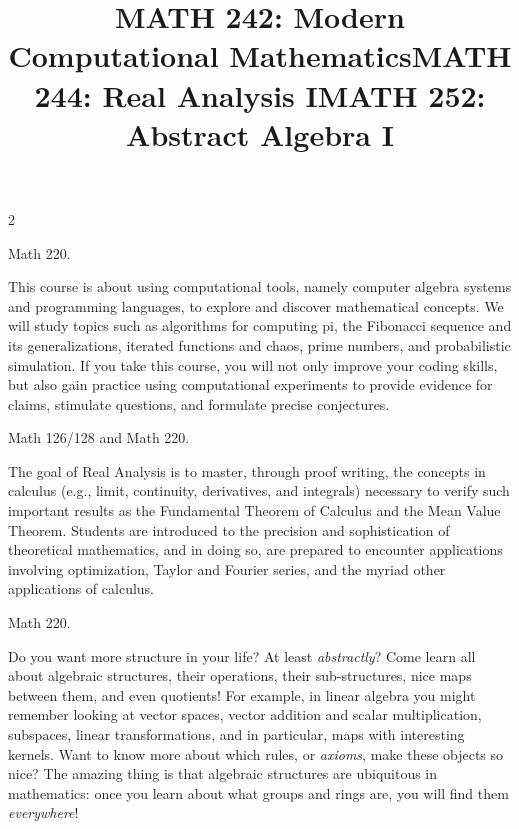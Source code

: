 \documentclass[12pt]{article}
\newcommand{\bolder}{\textbf}
\begin{document}
\begin{multicols}{2}
\begin{tcolorbox}[colback=white, colframe=black]
    \begin{center}
    \title{{\large \bolder{MATH 242: Modern Computational Mathematics}}}
    \end{center}
\end{tcolorbox}

 Math 220.

This course is about using computational tools, namely computer algebra systems and programming languages, to explore and discover mathematical concepts. We will study topics such as algorithms for computing pi, the Fibonacci sequence and its generalizations, iterated functions and chaos, prime numbers, and probabilistic simulation. If you take this course, you will not only improve your coding skills, but also gain practice using computational experiments to provide evidence for claims, stimulate questions, and formulate precise conjectures. 


\begin{tcolorbox}[colback=white, colframe=black]
    \begin{center}
    \title{{\large \bolder{MATH 244: Real Analysis I}}}
    \end{center}
\end{tcolorbox}

 Math 126/128 and Math 220.

The goal of Real Analysis is to master, through proof writing, the concepts in calculus (e.g., limit, continuity, derivatives, and integrals) necessary to verify such important results as the Fundamental Theorem of Calculus and the Mean Value Theorem. Students are introduced to the precision and sophistication of theoretical mathematics, and in doing so, are prepared to encounter applications involving optimization, Taylor and Fourier series, and the myriad other applications of calculus.


\begin{tcolorbox}[colback=white, colframe=black]
    \begin{center}
    \title{{\large \bolder{MATH 252: Abstract Algebra I}}}
    \end{center}
\end{tcolorbox}

 Math 220.

Do you want more structure in your life? At least \textit{abstractly}? Come learn all about algebraic structures, their operations, their sub-structures, nice maps between them, and even quotients! For example, in linear algebra you might remember looking at vector spaces, vector addition and scalar multiplication, subspaces, linear transformations, and in particular, maps with interesting kernels. Want to know more about which rules, or \textit{axioms}, make these objects so nice? The amazing thing is that algebraic structures are ubiquitous in mathematics: once you learn about what groups and rings are, you will find them \textit{everywhere}!



\end{multicols}
\end{document}
